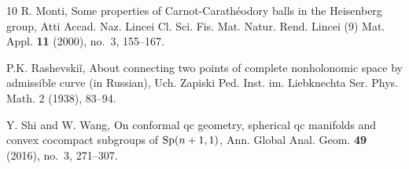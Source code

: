 \documentclass [12pt,a4paper]{amsart}
\theoremstyle{plain}
\theoremstyle{definition}
\numberwithin{equation}{section}
\begin{document}
\begin{thebibliography}{10}
R. Monti, Some properties of Carnot-Carath\'eodory balls in the Heisenberg group, Atti Accad. Naz. Lincei Cl. Sci. Fis. Mat. Natur. Rend. Lincei (9) Mat. Appl. {\bf 11} (2000), no.~3, 155--167.

P.K. Rashevski{\v{i}}, About connecting two points of complete nonholonomic space by admissible
curve (in Russian), Uch. Zapiski Ped. Inst. im. Liebknechta Ser. Phys. Math. 2 (1938), 83--94.

Y. Shi and W. Wang, On conformal qc geometry, spherical qc manifolds and convex cocompact subgroups of ${\rm Sp}(n+1,1)$, Ann. Global Anal. Geom. {\bf 49} (2016), no.~3, 271--307.
  
 
  
  
%  




\end{thebibliography} 
\end{document}
